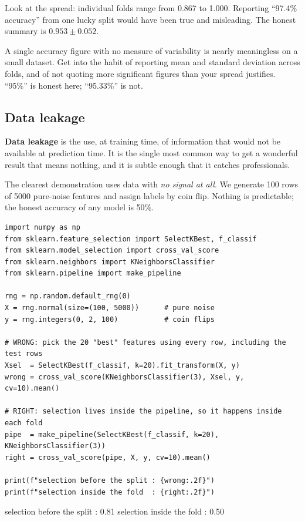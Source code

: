 \documentclass[11pt]{article}
\begin{document}
Look at the spread: individual folds range from 0.867 to 1.000. Reporting
``97.4\% accuracy'' from one lucky split would have been true and misleading.
The honest summary is $0.953 \pm 0.052$.

\begin{caution}
A single accuracy figure with no measure of variability is nearly meaningless on
a small dataset. Get into the habit of reporting mean and standard deviation
across folds, and of not quoting more significant figures than your spread
justifies. ``95\%'' is honest here; ``95.33\%'' is not.
\end{caution}

\subsection{Data leakage}
\label{sec:leakage}

\textbf{Data leakage} is the use, at training time, of information that would
not be available at prediction time. It is the single most common way to get a
wonderful result that means nothing, and it is subtle enough that it catches
professionals.

The clearest demonstration uses data with \emph{no signal at all}. We generate
100 rows of 5000 pure-noise features and assign labels by coin flip. Nothing is
predictable; the honest accuracy of any model is 50\%.

\begin{lstlisting}
import numpy as np
from sklearn.feature_selection import SelectKBest, f_classif
from sklearn.model_selection import cross_val_score
from sklearn.neighbors import KNeighborsClassifier
from sklearn.pipeline import make_pipeline

rng = np.random.default_rng(0)
X = rng.normal(size=(100, 5000))      # pure noise
y = rng.integers(0, 2, 100)           # coin flips

# WRONG: pick the 20 "best" features using every row, including the test rows
Xsel  = SelectKBest(f_classif, k=20).fit_transform(X, y)
wrong = cross_val_score(KNeighborsClassifier(3), Xsel, y, cv=10).mean()

# RIGHT: selection lives inside the pipeline, so it happens inside each fold
pipe  = make_pipeline(SelectKBest(f_classif, k=20), KNeighborsClassifier(3))
right = cross_val_score(pipe, X, y, cv=10).mean()

print(f"selection before the split : {wrong:.2f}")
print(f"selection inside the fold  : {right:.2f}")
\end{lstlisting}
\begin{codeout}
selection before the split : 0.81
selection inside the fold  : 0.50
\end{codeout}
\end{document}
